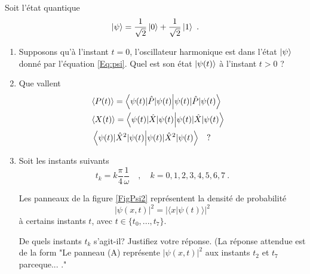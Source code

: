 \newpage

Soit l'état quantique 
\begin{equation}
\vert \psi \rangle = 
 \frac{1}{\sqrt{2}}\ket{0}  +  \frac{1}{\sqrt{2}}\ket{1}\ .
 \label{Eq:psi}
\end{equation}

\begin{enumerate}


\item 
Supposons qu'à l'instant $t=0$, l'oscillateur harmonique est dans l'état $\ket{\psi}$ donné par l'équation \eqref{Eq:psi}. Quel est son état $\ket{\psi(t)}$ à l'instant $t>0$ ?

\item 
Que vallent 
\begin{eqnarray}
&\langle P(t) \rangle = \braket{\psi (t)|\hat P|\psi(t)}&\\
&\langle X(t) \rangle = \braket{\psi(t)|\hat X|\psi(t)}&\\
&\braket{\psi(t)| \hat X^2 |\psi(t)}\quad  ?&
\end{eqnarray}




\item Soit les instants suivants 
\begin{equation}
t_k= k \frac{\pi}{4} \frac{1}{\omega}\quad , \quad k=0,1,2,3,4,5,6,7 \ .\label{Eq:tk}
\end{equation}


Les panneaux de la figure \ref{FigPsi2} représentent la densité de probabilité 
\begin{equation}
\vert \psi(x,t)\vert^2 = \vert \langle x \vert \psi(t) \rangle \vert^2
\end{equation}
 à certains instants $t$, avec $t \in \{t_0,...,t_7\}$.

De quels instants $t_k$ s'agit-il?   Justifiez votre réponse. 
(La réponse attendue est de la form "Le panneau (A) représente   $ \vert \psi(x,t)\vert^2$ aux instants $t_2$ et $t_7$ parceque... ."



\end{enumerate}

